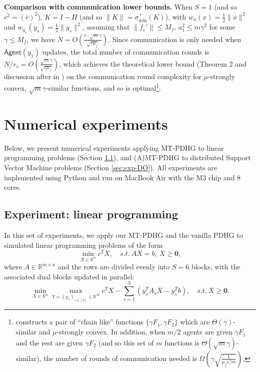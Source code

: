 \documentclass[10pt]{article}
\newcommand{\mb}{\mathbf}
\newcommand{\R}{\mathbb{R}}
\newcommand{\agent}{\mathsf{Agent}}
\begin{document}
\textbf{Comparison with communication lower bounds.} When $S = 1$ (and so $\overline{r^2} = (\overline{r})^2$), $K = I-\Pi$ (and so $\|K\| = \sigma_{\min}^+(K)$), with $w_{x}(x) = \frac{1}{2}\|x\|^2$ and $w_{y_s}(y_s) = \frac{1}{2}\|y_s\|^2$, assuming that $\|f_v'\|\leq M_f$, $a_1^2\leq m\gamma^2$ for some $\gamma\leq M_f$, we have $N = O(\frac{\overline{r}\cdot \sqrt{m}\gamma}{\sqrt{\epsilon \mu_f}})$. Since communication is only needed when $\agent(y_1)$ updates, the total number of communication rounds is $N/r_s = O(\frac{\sqrt{m}\gamma}{\sqrt{\epsilon \mu_f}})$, which achieves the theoretical lower bound (Theorem 2 and discussion after in \cite{ArjevaniShamir2015Communication}) on the communication round complexity for $\mu$-strongly convex, $\sqrt{m}\gamma$-similar functions, and so is optimal\footnote{\cite{ArjevaniShamir2015Communication} constructs a pair of ``chain like'' functions $\{\gamma F_1,\gamma F_2\}$ which are $\Theta(\gamma )$-similar and $\mu$-strongly convex. In addition, when $m/2$ agents are given $\gamma F_1$ and the rest are given $\gamma F_2$ (and so this set of $m$ functions is $\Theta(\sqrt{m}\gamma)$-similar), the number of rounds of communication needed is $\Omega(\gamma\sqrt{\frac{1}{\mu_f\epsilon/m}})$.}. 





\section{Numerical experiments}\label{sec:exp}

Below, we present numerical experiments applying MT-PDHG to linear programming problems (Section \ref{sec:exp-LP}), and (A)MT-PDHG to distributed Support Vector Machine problems (Section \ref{sec:exp-DO}). All experiments are implemented using Python and run on MacBook Air with the M3 chip and 8 cores.


\subsection{Experiment: linear programming}\label{sec:exp-LP}
In this set of experiments, we apply our MT-PDHG and the vanilla PDHG to simulated linear programming problems of the form
\begin{equation*}
    \min_{X\in \R^n} c^TX,\quad s.t.~AX =b,~X\geq \mb 0,
\end{equation*}
where $A\in \R^{m\times n}$ and the rows are divided evenly into $S = 6$ blocks, with the associated dual blocks updated in parallel: 
\begin{equation*}
    \min_{X\in \R^n}\max_{Y = (y_s)_{s\in [S]}\in \R^m} c^TX - \sum_{s=1}^S (y_s^TA_sX-y_s^Tb),\quad s.t.~X\geq \mb 0.
\end{equation*}
\end{document}
